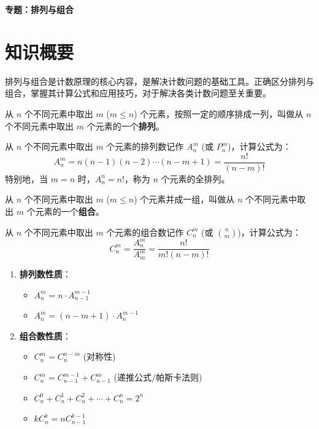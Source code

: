 \documentclass[11pt]{ctexrep}
\begin{document}
\begin{center}
    {\LARGE\bfseries 专题：排列与组合}
\end{center}

\section*{知识概要}

排列与组合是计数原理的核心内容，是解决计数问题的基础工具。正确区分排列与组合，掌握其计算公式和应用技巧，对于解决各类计数问题至关重要。

\begin{definition}[排列]
    从 $n$ 个不同元素中取出 $m$ ($m \leq n$) 个元素，按照一定的顺序排成一列，叫做从 $n$ 个不同元素中取出 $m$ 个元素的一个\textbf{排列}。
    
    从 $n$ 个不同元素中取出 $m$ 个元素的排列数记作 $A_n^m$ (或 $P_n^m$)，计算公式为：
    \[
        A_n^m = n(n-1)(n-2)\cdots(n-m+1) = \frac{n!}{(n-m)!}
    \]
    特别地，当 $m = n$ 时，$A_n^n = n!$，称为 $n$ 个元素的全排列。
\end{definition}

\begin{definition}[组合]
    从 $n$ 个不同元素中取出 $m$ ($m \leq n$) 个元素并成一组，叫做从 $n$ 个不同元素中取出 $m$ 个元素的一个\textbf{组合}。
    
    从 $n$ 个不同元素中取出 $m$ 个元素的组合数记作 $C_n^m$ (或 $\binom{n}{m}$)，计算公式为：
    \[
        C_n^m = \frac{A_n^m}{A_m^m} = \frac{n!}{m!(n-m)!}
    \]
\end{definition}

\begin{property}[排列与组合的基本性质]
    \begin{enumerate}
        \item \textbf{排列数性质}：
        \begin{itemize}
            \item $A_n^m = n \cdot A_{n-1}^{m-1}$
            \item $A_n^m = (n-m+1) \cdot A_n^{m-1}$
        \end{itemize}
        
        \item \textbf{组合数性质}：
        \begin{itemize}
            \item $C_n^m = C_n^{n-m}$ (对称性)
            \item $C_n^m = C_{n-1}^{m-1} + C_{n-1}^m$ (递推公式/帕斯卡法则)
            \item $C_n^0 + C_n^1 + C_n^2 + \cdots + C_n^n = 2^n$
            \item $kC_n^k = nC_{n-1}^{k-1}$
        \end{itemize}
    \end{enumerate}
\end{property}
\end{document}
